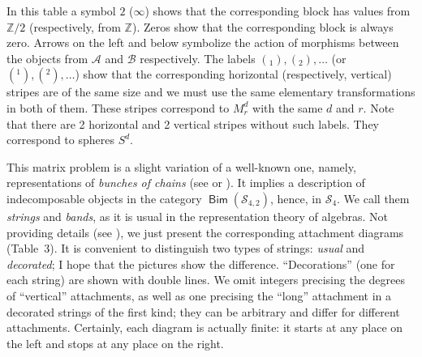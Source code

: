 \documentclass[12pt,a4paper]{amsart}
\theoremstyle{definition}
\theoremstyle{remark}
\numberwithin{equation}{section}
\begin{document}
  In this table a symbol $2$ (${\infty}$) shows that the corresponding block
 has values from ${\mathbb Z}/2$ (respectively, from ${\mathbb Z}$). Zeros show that
 the corresponding block is always zero.  Arrows on the left and
 below symbolize the action of morphisms between the objects from
 ${\mathscr A}$ and ${\mathscr B}$ respectively. The labels ${(_1)},{(_2)},\ldots$
 (or ${(^1)},{(^2)},\ldots$) show that the corresponding horizontal
 (respectively, vertical) stripes are of the same size and we must use
 the same elementary transformations in both of them. These stripes
 correspond to $M^d_r$ with the same $d$ and $r$. Note that there
 are 2 horizontal and 2 vertical stripes without such labels. They
 correspond to spheres $S^d$.

 This matrix problem is a slight variation of a well-known one,
 namely, representations of \emph{bunches of chains} (see \cite{bon}
 or \cite[Appendix B]{bd}). It implies a description of indecomposable
 objects in the category ${\mathop\mathsf{Bim}\nolimits}({\mathscr S}_{4,2})$, hence, in ${\mathscr S}_4$. We call
 them \emph{strings} and \emph{bands}, as it is usual in the
 representation theory of algebras. Not providing details (see
 \cite{d1}), we just present the corresponding attachment diagrams
 (Table~3). It is convenient to distinguish two types of strings:
 \emph{usual} and \emph{decorated}; I hope that the pictures show the
 difference. ``Decorations'' (one for each string) are shown with
 double lines. We omit integers precising the degrees of ``vertical''
 attachments, as well as one precising the ``long'' attachment in a
 decorated strings of the first kind; they can be arbitrary and differ
 for different attachments. Certainly, each diagram is actually
 finite: it starts at any place on the left and stops at any place on
 the right.
\end{document}
